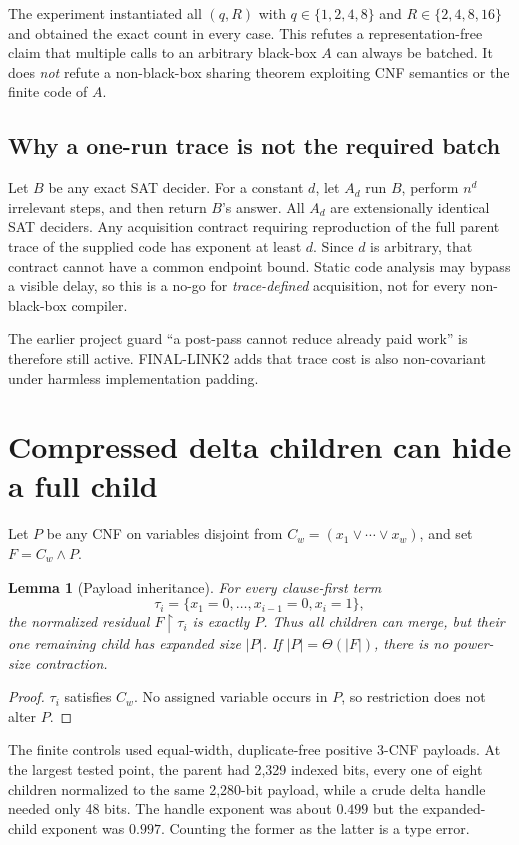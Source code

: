 \documentclass[11pt]{article}
\newtheorem{lemma}[theorem]{Lemma}
\begin{document}
The experiment instantiated all $(q,R)$ with $q\in\{1,2,4,8\}$ and
$R\in\{2,4,8,16\}$ and obtained the exact count in every case.  This refutes
a representation-free claim that multiple calls to an arbitrary black-box
$A$ can always be batched.  It does \emph{not} refute a non-black-box sharing
theorem exploiting CNF semantics or the finite code of $A$.

\subsection{Why a one-run trace is not the required batch}

Let $B$ be any exact SAT decider.  For a constant $d$, let $A_d$ run $B$,
perform $n^d$ irrelevant steps, and then return $B$'s answer.  All $A_d$ are
extensionally identical SAT deciders.  Any acquisition contract requiring
reproduction of the full parent trace of the supplied code has exponent at
least $d$.  Since $d$ is arbitrary, that contract cannot have a common
endpoint bound.  Static code analysis may bypass a visible delay, so this is
a no-go for \emph{trace-defined} acquisition, not for every non-black-box
compiler.

The earlier project guard ``a post-pass cannot reduce already paid work'' is
therefore still active.  FINAL-LINK2 adds that trace cost is also non-covariant
under harmless implementation padding.

\section{Compressed delta children can hide a full child}

Let $P$ be any CNF on variables disjoint from
$C_w=(x_1\vee\cdots\vee x_w)$, and set $F=C_w\wedge P$.

\begin{lemma}[Payload inheritance]
For every clause-first term
\[
 \tau_i=\{x_1=0,\ldots,x_{i-1}=0,x_i=1\},
\]
the normalized residual $F\upharpoonright\tau_i$ is exactly $P$.  Thus all
children can merge, but their one remaining child has expanded size $|P|$.
If $|P|=\Theta(|F|)$, there is no power-size contraction.
\end{lemma}

\begin{proof}
$\tau_i$ satisfies $C_w$.  No assigned variable occurs in $P$, so restriction
does not alter $P$.
\end{proof}

The finite controls used equal-width, duplicate-free positive 3-CNF payloads.
At the largest tested point, the parent had 2,329 indexed bits, every one of
eight children normalized to the same 2,280-bit payload, while a crude delta
handle needed only 48 bits.  The handle exponent was about $0.499$ but the
expanded-child exponent was $0.997$.  Counting the former as the latter is a
type error.
\end{document}
